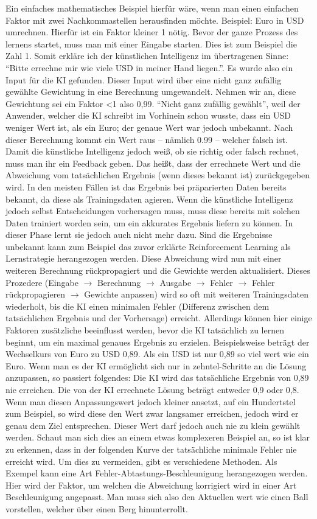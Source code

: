 Ein einfaches mathematisches Beispiel hierfür wäre, wenn man einen einfachen Faktor mit zwei Nachkommastellen herausfinden möchte. Beispiel: Euro in USD umrechnen. Hierfür ist ein Faktor kleiner 1 nötig. Bevor der ganze Prozess des lernens startet, muss man mit einer Eingabe starten. Dies ist zum Beispiel die Zahl 1. Somit erkläre ich der künstlichen Intelligenz im übertragenen Sinne: ``Bitte errechne mir wie viele USD in meiner Hand liegen.''. Es wurde also ein Input für die KI gefunden. Dieser Input wird über eine nicht ganz zufällig gewählte Gewichtung in eine Berechnung umgewandelt. Nehmen wir an, diese Gewichtung sei ein Faktor <1 also 0,99. ``Nicht ganz zufällig gewählt'', weil der Anwender, welcher die KI schreibt im Vorhinein schon wusste, dass ein USD weniger Wert ist, als ein Euro; der genaue Wert war jedoch unbekannt. Nach dieser Berechnung kommt ein Wert raus – nämlich 0.99 – welcher falsch ist. Damit die künstliche Intelligenz jedoch weiß, ob sie richtig oder falsch rechnet, muss man ihr ein Feedback geben. Das heißt, dass der errechnete Wert und die Abweichung vom tatsächlichen Ergebnis (wenn dieses bekannt ist) zurückgegeben wird. In den meisten Fällen ist das Ergebnis bei präparierten Daten bereits bekannt, da diese als Trainingsdaten agieren. Wenn die künstliche Intelligenz jedoch selbst Entscheidungen vorhersagen muss, muss diese bereits mit solchen Daten trainiert worden sein, um ein akkurates Ergebnis liefern zu können. In dieser Phase lernt sie jedoch auch nicht mehr dazu. Sind die Ergebnisse unbekannt kann zum Beispiel das zuvor erklärte Reinforcement Learning als Lernstrategie herangezogen werden. Diese Abweichung wird nun mit einer weiteren Berechnung rückpropagiert und die Gewichte werden aktualisiert. Dieses Prozedere (Eingabe $\rightarrow$ Berechnung $\rightarrow$ Ausgabe $\rightarrow$ Fehler $\rightarrow$ Fehler rückpropagieren $\rightarrow$ Gewichte anpassen) wird so oft mit weiteren Trainingsdaten wiederholt, bis die KI einen minimalen Fehler (Differenz zwischen dem tatsächlichen Ergebnis und der Vorhersage) erreicht.
Allerdings können hier einige Faktoren zusätzliche beeinflusst werden, bevor die KI tatsächlich zu lernen beginnt, um ein maximal genaues Ergebnis zu erzielen. Beispielsweise beträgt der Wechselkurs von Euro zu USD 0,89. Als ein USD ist nur 0,89 so viel wert wie ein Euro. Wenn man es der KI ermöglicht sich nur in zehntel-Schritte an die Lösung anzupassen, so passiert folgendes:
Die KI wird das tatsächliche Ergebnis von 0,89 nie erreichen. Die von der KI errechnete Lösung beträgt entweder 0,9 oder 0,8. Wenn man diesen Anpassungswert jedoch kleiner ansetzt, auf ein Hundertstel zum Beispiel, so wird diese den Wert zwar langsamer erreichen, jedoch wird er genau dem Ziel entsprechen.
Dieser Wert darf jedoch auch nie zu klein gewählt werden. Schaut man sich dies an einem etwas komplexeren Beispiel an, so ist klar zu erkennen, dass in der folgenden Kurve der tatsächliche minimale Fehler nie erreicht wird. Um dies zu vermeiden, gibt es verschiedene Methoden. Als Exempel kann eine Art Fehler-Abtastungs-Beschleunigung herangezogen werden. Hier wird der Faktor, um welchen die Abweichung korrigiert wird in einer Art Beschleunigung angepasst. Man muss sich also den Aktuellen wert wie einen Ball vorstellen, welcher über einen Berg hinunterrollt.

